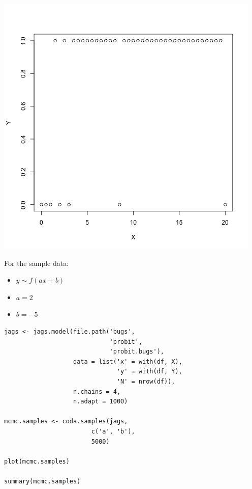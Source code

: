 \documentclass{beamer}
\begin{document}
\begin{frame}[fragile]
  \begin{center}
    \includegraphics[scale = 0.4]{../graphs/robit/data_plot.png}
  \end{center}
\end{frame}

\begin{frame}
  For the sample data:
  \begin{itemize}
    \item{$y \sim f(ax + b)$}
    \item{$a = 2$}
    \item{$b = -5$}
  \end{itemize}
\end{frame}

\begin{frame}[fragile]
  \begin{verbatim}
jags <- jags.model(file.path('bugs',
                             'probit',
                             'probit.bugs'),
                   data = list('x' = with(df, X),
                               'y' = with(df, Y),
                               'N' = nrow(df)),
                   n.chains = 4,
                   n.adapt = 1000)
 
mcmc.samples <- coda.samples(jags,
                        c('a', 'b'),
                        5000)

plot(mcmc.samples)

summary(mcmc.samples)
  \end{verbatim}
\end{frame}
\end{document}
